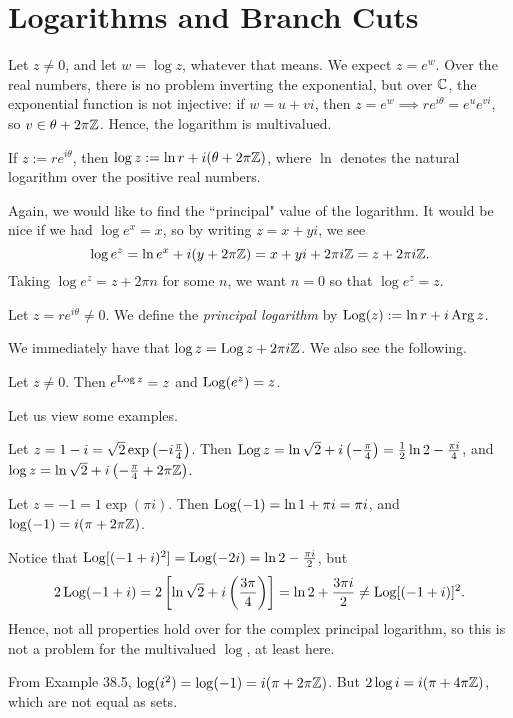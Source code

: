 \documentclass{article}
\begin{document}
\section{Logarithms and Branch Cuts}
Let $z\neq 0$, and let $w = \log z$, whatever that means. We expect $z = e^w$. Over the real numbers, there is no problem inverting the exponential, but over $\mathbb C$, the exponential function is not injective: if $w = u+vi$, then $z=e^w\implies re^{i\theta} = e^ue^{vi}$, so $v\in \theta + 2\pi \mathbb Z$. Hence, the logarithm is multivalued.
\begin{definition}
If $z := re^{i\theta}$, then $\log z := \ln r + i(\theta + 2\pi\mathbb Z)$, where $\ln$ denotes the natural logarithm over the positive real numbers.
\end{definition}
Again, we would like to find the ``principal" value of the logarithm. It would be nice if we had $\log e^x = x$, so by writing $z=x+yi$, we see
$$\log e^z = \ln e^x + i(y + 2\pi \mathbb Z) = x + yi + 2\pi i \mathbb Z = z+2\pi i\mathbb Z.$$
Taking $\log e^z = z+2\pi n$ for some $n$, we want $n=0$ so that $\log e^z = z$.
\begin{definition}
Let $z = re^{i\theta}\neq 0$. We define the \textit{principal logarithm} by $\operatorname{Log}(z) := \ln r + i\operatorname{Arg} z$.
\end{definition}
We immediately have that $\log z= \operatorname{Log} z + 2\pi i \mathbb Z$. We also see the following.
\begin{proposition}
Let $z\neq 0$. Then $e^{\operatorname{Log} z} = z$ and $\operatorname{Log}(e^z)  =z$.
\end{proposition}
Let us view some examples.
\begin{example}
Let $z = 1-i = \sqrt 2\exp\left(-i\frac\pi4 \right)$. Then $\operatorname{Log} z=  \ln\sqrt 2 + i\left(-\frac\pi4 \right) = \frac 12\ln 2 - \frac{\pi i}4$, and $\log z = \ln\sqrt 2 + i\left(-\frac\pi4 + 2\pi\mathbb Z \right)$.
\end{example}
\begin{example}
Let $z=-1 = 1\exp(\pi i)$. Then $\operatorname{Log}(-1) = \ln 1 + \pi i = \pi i$, and $\log(-1) = i(\pi + 2\pi\mathbb Z)$.
\end{example}
\begin{example}
Notice that $\operatorname{Log}[(-1+i)^2] = \operatorname{Log}(-2i) = \ln 2 - \frac{\pi i}2$, but
$$2\operatorname{Log}(-1+i) = 2\left[\ln\sqrt 2 + i\left(\frac{3\pi}4 \right)\right] = \ln 2 + \frac{3\pi i}2 \neq \operatorname{Log}[(-1+i)]^2.$$
Hence, not all properties hold over for the complex principal logarithm, so this is not a problem for the multivalued $\log$, at least here.
\end{example}
\newpage
\begin{example}
From Example 38.5, $\log(i^2) = \log(-1) = i(\pi + 2\pi \mathbb Z)$. But $2\log i = i (\pi + 4\pi\mathbb Z)$, which are not equal as sets.
\end{example}
\end{document}
